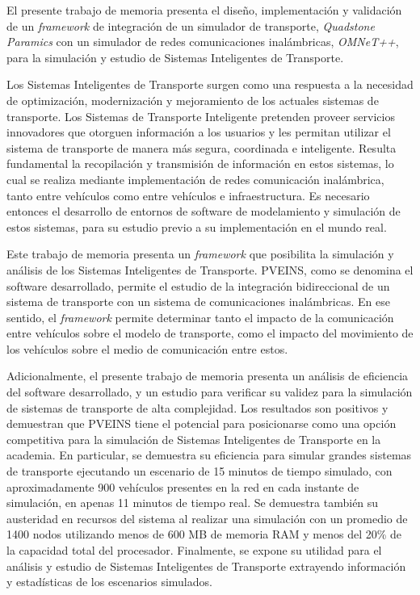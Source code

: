 El presente trabajo de memoria presenta el diseño, implementación y validación de un \emph{framework} de integración de un simulador de transporte, \emph{Quadstone Paramics} con un simulador de redes comunicaciones inalámbricas, \emph{OMNeT++}, para la simulación y estudio de Sistemas Inteligentes de Transporte.

Los Sistemas Inteligentes de Transporte surgen como una respuesta a la necesidad de optimización, modernización y mejoramiento de los actuales sistemas de transporte. Los Sistemas de Transporte Inteligente pretenden proveer servicios innovadores que otorguen información a los usuarios y les permitan utilizar el sistema de transporte de manera más segura, coordinada e inteligente. Resulta fundamental la recopilación y transmisión de información en estos sistemas, lo cual se realiza mediante implementación de redes comunicación inalámbrica, tanto entre vehículos como entre vehículos e infraestructura. Es necesario entonces el desarrollo de entornos de software de modelamiento y simulación de estos sistemas, para su estudio previo a su implementación en el mundo real.

Este trabajo de memoria presenta un \emph{framework} que posibilita la simulación y análisis de los Sistemas Inteligentes de Transporte. PVEINS, como se denomina el software desarrollado, permite el estudio de la integración bidireccional de un sistema de transporte con un sistema de comunicaciones inalámbricas. En ese sentido, el \emph{framework} permite determinar tanto el impacto de la comunicación entre vehículos sobre el modelo de transporte, como el impacto del movimiento de los vehículos sobre el medio de comunicación entre estos.


Adicionalmente, el presente trabajo de memoria presenta un análisis de eficiencia del software desarrollado, y un estudio para verificar su validez para la simulación de sistemas de transporte de alta complejidad. Los resultados son positivos y demuestran que PVEINS tiene el potencial para posicionarse como una opción competitiva para la simulación de Sistemas Inteligentes de Transporte en la academia. En particular, se demuestra su eficiencia para simular grandes sistemas de transporte ejecutando un escenario de 15 minutos de tiempo simulado, con aproximadamente 900 vehículos presentes en la red en cada instante de simulación, en apenas 11 minutos de tiempo real. Se demuestra también su austeridad en recursos del sistema al realizar una simulación con un promedio de 1400 nodos utilizando menos de 600 MB de memoria RAM y menos del 20\% de la capacidad total del procesador. Finalmente, se expone su utilidad para el análisis y estudio de Sistemas Inteligentes de Transporte extrayendo información y estadísticas de los escenarios simulados.
